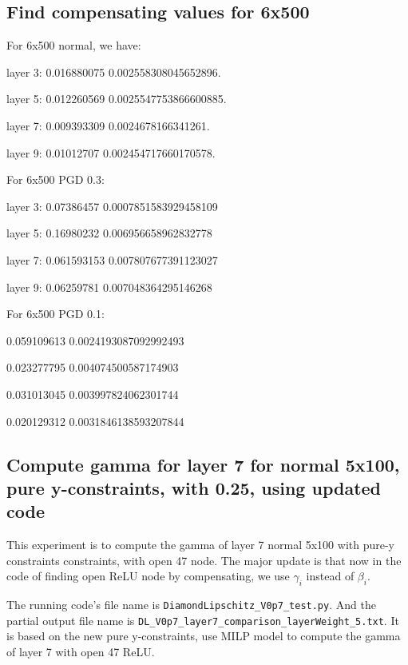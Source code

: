 \documentclass{llncs}
\begin{document}
\subsection*{Find compensating values for 6x500}

For 6x500 normal, we have:

layer 3:  0.016880075 0.002558308045652896.

layer 5:  0.012260569 0.0025547753866600885.

layer 7:  0.009393309 0.0024678166341261.

layer 9:  0.01012707 0.002454717660170578.


\vspace*{1ex}


For 6x500 PGD 0.3:



layer 3:  0.07386457 0.0007851583929458109

layer 5:  0.16980232 0.006956658962832778

layer 7:  0.061593153 0.007807677391123027

layer 9:  0.06259781 0.007048364295146268

\vspace*{1ex}

For 6x500 PGD 0.1:

0.059109613 0.0024193087092992493

0.023277795 0.004074500587174903

0.031013045 0.003997824062301744

0.020129312 0.0031846138593207844





\subsection{Compute gamma for layer 7 for normal 5x100, pure y-constraints, with 0.25, using updated code}

This experiment is to compute the gamma of layer 7 normal 5x100 with pure-y constraints constraints, with open 47 node. The major update is that now in the code of finding open ReLU node by compensating, we use $\gamma_i$ instead of $\beta_i$.

\vspace*{1ex}

The running code's file name is \verb*|DiamondLipschitz_V0p7_test.py|. And the partial output file name is \verb*|DL_V0p7_layer7_comparison_layerWeight_5.txt|.  It is based on the new pure y-constraints, use MILP model to compute the gamma of layer 7 with open 47 ReLU.
\end{document}
